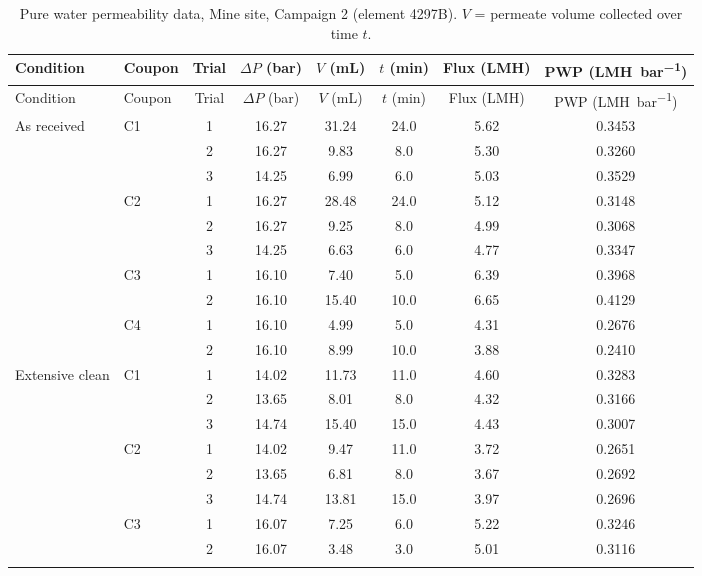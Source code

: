 {\footnotesize\setlength{\tabcolsep}{4pt}
\begin{longtable}{llcccccc}
  \caption{Pure water permeability data, Mine site, Campaign 2 (element 4297B). $V$ = permeate volume collected over time $t$.}
  \label{tab:app-c2-mine-pwp}\\
  \toprule
  Condition & Coupon & Trial & $\Delta P$ (\unit{bar}) & $V$ (\unit{mL}) & $t$ (\unit{min}) & Flux (\unit{LMH}) & PWP (\unit{LMH.bar^{-1}}) \\
  \midrule
  \endfirsthead
  \toprule
  Condition & Coupon & Trial & $\Delta P$ (\unit{bar}) & $V$ (\unit{mL}) & $t$ (\unit{min}) & Flux (\unit{LMH}) & PWP (\unit{LMH.bar^{-1}}) \\
  \midrule
  \endhead
    As received & C1 & 1 & 16.27 & 31.24 & 24.0 & 5.62 & 0.3453 \\
     &  & 2 & 16.27 & 9.83 & 8.0 & 5.30 & 0.3260 \\
     &  & 3 & 14.25 & 6.99 & 6.0 & 5.03 & 0.3529 \\
    \addlinespace[2pt]
     & C2 & 1 & 16.27 & 28.48 & 24.0 & 5.12 & 0.3148 \\
     &  & 2 & 16.27 & 9.25 & 8.0 & 4.99 & 0.3068 \\
     &  & 3 & 14.25 & 6.63 & 6.0 & 4.77 & 0.3347 \\
    \addlinespace[2pt]
     & C3 & 1 & 16.10 & 7.40 & 5.0 & 6.39 & 0.3968 \\
     &  & 2 & 16.10 & 15.40 & 10.0 & 6.65 & 0.4129 \\
    \addlinespace[2pt]
     & C4 & 1 & 16.10 & 4.99 & 5.0 & 4.31 & 0.2676 \\
     &  & 2 & 16.10 & 8.99 & 10.0 & 3.88 & 0.2410 \\
    \midrule
    Extensive clean & C1 & 1 & 14.02 & 11.73 & 11.0 & 4.60 & 0.3283 \\
     &  & 2 & 13.65 & 8.01 & 8.0 & 4.32 & 0.3166 \\
     &  & 3 & 14.74 & 15.40 & 15.0 & 4.43 & 0.3007 \\
    \addlinespace[2pt]
     & C2 & 1 & 14.02 & 9.47 & 11.0 & 3.72 & 0.2651 \\
     &  & 2 & 13.65 & 6.81 & 8.0 & 3.67 & 0.2692 \\
     &  & 3 & 14.74 & 13.81 & 15.0 & 3.97 & 0.2696 \\
    \addlinespace[2pt]
     & C3 & 1 & 16.07 & 7.25 & 6.0 & 5.22 & 0.3246 \\
     &  & 2 & 16.07 & 3.48 & 3.0 & 5.01 & 0.3116 \\
    \addlinespace[2pt]

\end{longtable}}
